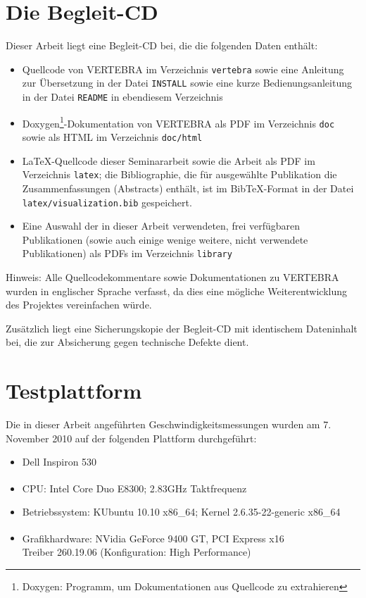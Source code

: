 \documentclass[ngerman,pdftex,paper=A4,DIV=calc,titlepage,12pt]{scrartcl}
\newtheorem[L]{boxedDefinition}{Definition}
\begin{document}
\newpage
%
%
\appendix\label{appendixstart}
\section{Die Begleit-CD}
Dieser Arbeit liegt eine Begleit-CD bei, die die folgenden Daten enthält:
\begin{itemize}
 \item Quellcode von VERTEBRA im Verzeichnis \texttt{vertebra} sowie eine Anleitung zur Übersetzung in der Datei \texttt{INSTALL} sowie eine kurze Bedienungsanleitung in der Datei \texttt{README} in ebendiesem Verzeichnis
 \item Doxygen\footnote{Doxygen: Programm, um Dokumentationen aus Quellcode zu extrahieren}-Dokumentation von VERTEBRA als PDF im Verzeichnis \texttt{doc} sowie als HTML im Verzeichnis \texttt{doc/html}
 \item \LaTeX-Quellcode dieser Seminararbeit sowie die Arbeit als PDF im Verzeichnis \texttt{latex}; die Bibliographie, die für ausgewählte Publikation die Zusammenfassungen (Abstracts) enthält, ist im Bib\TeX -Format in der Datei \texttt{latex/visualization.bib} gespeichert.
 \item Eine Auswahl der in dieser Arbeit verwendeten, frei verfügbaren Publikationen (sowie auch einige wenige weitere, nicht verwendete Publikationen) als PDFs im Verzeichnis \texttt{library}
\end{itemize}

Hinweis: Alle Quellcodekommentare sowie Dokumentationen zu VERTEBRA wurden in englischer Sprache verfasst, da dies eine mögliche Weiterentwicklung des Projektes vereinfachen würde.

Zusätzlich liegt eine Sicherungskopie der Begleit-CD mit identischem Dateninhalt bei, die zur Absicherung gegen technische Defekte dient.

\section{Testplattform}\label{apdx:testplatform}
Die in dieser Arbeit angeführten Geschwindigkeitsmessungen wurden am 7. November 2010 auf der folgenden Plattform durchgeführt:
\begin{itemize}
  \item Dell Inspiron 530
  \item CPU: Intel\textsuperscript{\textregistered} Core Duo E8300; 2.83GHz Taktfrequenz
  \item Betriebssystem: KUbuntu 10.10 x86\_64; Kernel 2.6.35-22-generic x86\_64
  \item Grafikhardware: NVidia\textsuperscript{\textregistered} GeForce 9400 GT, PCI Express x16\\
	Treiber 260.19.06 (Konfiguration: High Performance)
\end{itemize}
\newpage
\end{document}

